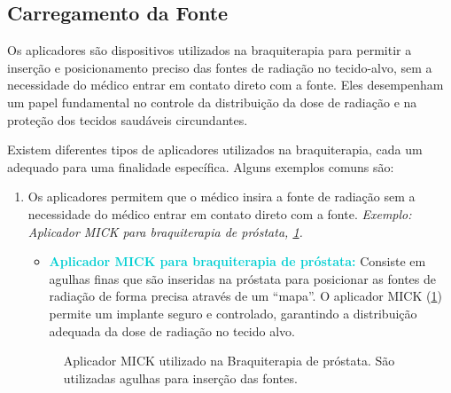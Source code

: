 \documentclass[11pt,a4paper]{article}
\newcounter{exemplo}
\begin{document}
		\subsection{Carregamento da Fonte}

			
		Os aplicadores são dispositivos utilizados na braquiterapia para permitir a inserção e posicionamento preciso das fontes de radiação no tecido-alvo, sem a necessidade do médico entrar em contato direto com a fonte. Eles desempenham um papel fundamental no controle da distribuição da dose de radiação e na proteção dos tecidos saudáveis circundantes.

		Existem diferentes tipos de aplicadores utilizados na braquiterapia, cada um adequado para uma finalidade específica. Alguns exemplos comuns são:

			\begin{enumerate}
				\item Os aplicadores permitem que o médico insira a fonte de radiação sem a necessidade do médico entrar em contato direto com a fonte. \textit{\textcolor{CarnationPink}{Exemplo:}} \textit{Aplicador MICK para braquiterapia de próstata,  \ref{img:aplicadorMick}.}
					
				\begin{itemize}[label=\textcolor{CarnationPink}{$\star$}]
						\item \textcolor{DarkTurquoise}{\textbf{Aplicador MICK para braquiterapia de próstata:}} Consiste em agulhas finas que são inseridas na próstata para posicionar as fontes de radiação de forma precisa através de um ``mapa''. O aplicador MICK (\ref{img:aplicadorMick}) permite um implante seguro e controlado, garantindo a distribuição adequada da dose de radiação no tecido alvo.
					\end{itemize}

					\begin{figure}[h]
						\centering
						\caption{Aplicador MICK utilizado na Braquiterapia de próstata. São utilizadas agulhas para inserção das fontes.}
						\label{img:aplicadorMick}
					\end{figure}
				

\end{enumerate}
\end{document}
